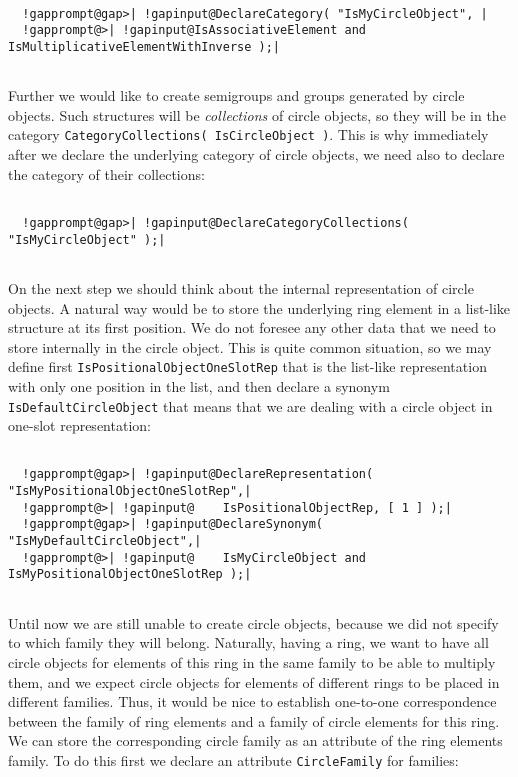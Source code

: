 \documentclass[a4paper,11pt]{report}
\begin{document}
{{ 
\begin{Verbatim}[commandchars=!@|,fontsize=\small,frame=single,label=Example]
  
  !gapprompt@gap>| !gapinput@DeclareCategory( "IsMyCircleObject", |
  !gapprompt@>| !gapinput@IsAssociativeElement and IsMultiplicativeElementWithInverse );|
  
\end{Verbatim}
 Further we would like to create semigroups and groups generated by circle
objects. Such structures will be \emph{collections} of circle objects, so they will be in the category \texttt{CategoryCollections( IsCircleObject )}. This is why immediately after we declare the underlying category of circle
objects, we need also to declare the category of their collections: 
\begin{Verbatim}[commandchars=!@|,fontsize=\small,frame=single,label=Example]
  
  !gapprompt@gap>| !gapinput@DeclareCategoryCollections( "IsMyCircleObject" );|
  
\end{Verbatim}
 On the next step we should think about the internal representation of circle
objects. A natural way would be to store the underlying ring element in a
list-like structure at its first position. We do not foresee any other data
that we need to store internally in the circle object. This is quite common
situation, so we may define first \texttt{IsPositionalObjectOneSlotRep} that is the list-like representation with only one position in the list, and
then declare a synonym \texttt{IsDefaultCircleObject} that means that we are dealing with a circle object in one-slot
representation: 
\begin{Verbatim}[commandchars=!@|,fontsize=\small,frame=single,label=Example]
  
  !gapprompt@gap>| !gapinput@DeclareRepresentation( "IsMyPositionalObjectOneSlotRep",|
  !gapprompt@>| !gapinput@    IsPositionalObjectRep, [ 1 ] );|
  !gapprompt@gap>| !gapinput@DeclareSynonym( "IsMyDefaultCircleObject",|
  !gapprompt@>| !gapinput@    IsMyCircleObject and IsMyPositionalObjectOneSlotRep );|
  
\end{Verbatim}
 Until now we are still unable to create circle objects, because we did not
specify to which family they will belong. Naturally, having a ring, we want to
have all circle objects for elements of this ring in the same family to be
able to multiply them, and we expect circle objects for elements of different
rings to be placed in different families. Thus, it would be nice to establish
one-to-one correspondence between the family of ring elements and a family of
circle elements for this ring. We can store the corresponding circle family as
an attribute of the ring elements family. To do this first we declare an
attribute \texttt{CircleFamily} for families: 
\begin{Verbatim}[commandchars=!@|,fontsize=\small,frame=single,label=Example]
  

\end{Verbatim}}}
\end{document}
